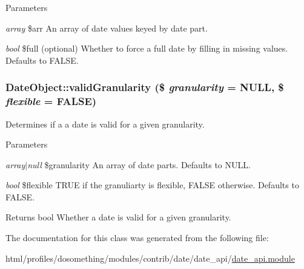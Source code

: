 \begin{DoxyParams}{Parameters}
\item[{\em array}]\$arr An array of date values keyed by date part. \item[{\em bool}]\$full (optional) Whether to force a full date by filling in missing values. Defaults to FALSE. \end{DoxyParams}
\hypertarget{classDateObject_aa4dfd0e15b696446ac26c0a6bc5284c6}{
\subsubsection[{validGranularity}]{\setlength{\rightskip}{0pt plus 5cm}DateObject::validGranularity (\$ {\em granularity} = {\ttfamily NULL}, \/  \$ {\em flexible} = {\ttfamily FALSE})}}
\label{classDateObject_aa4dfd0e15b696446ac26c0a6bc5284c6}
Determines if a a date is valid for a given granularity.


\begin{DoxyParams}{Parameters}
\item[{\em array$|$null}]\$granularity An array of date parts. Defaults to NULL. \item[{\em bool}]\$flexible TRUE if the granuliarty is flexible, FALSE otherwise. Defaults to FALSE.\end{DoxyParams}
\begin{DoxyReturn}{Returns}
bool Whether a date is valid for a given granularity. 
\end{DoxyReturn}


The documentation for this class was generated from the following file:\begin{DoxyCompactItemize}
\item 
html/profiles/dosomething/modules/contrib/date/date\_\-api/\hyperlink{date__api_8module}{date\_\-api.module}\end{DoxyCompactItemize}
